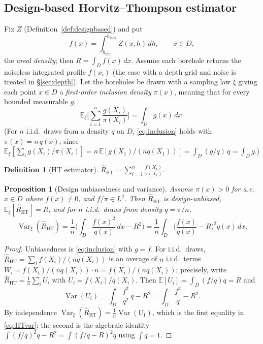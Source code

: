 \documentclass{amsart}
\newtheorem{proposition}[theorem]{Proposition}
\theoremstyle{definition}
\newtheorem{definition}[theorem]{Definition}
\newcommand{\E}{\mathbb{E}}
\newcommand{\Var}{\operatorname{Var}}
\newcommand{\Rhat}{\widehat R}
\begin{document}
\subsection{Design-based Horvitz--Thompson estimator}
Fix $Z$ (Definition~\ref{def:designbased}) and put
\begin{equation}\label{eq:profile}
f(x)=\int_{h_{\min}}^{h_{\max}}Z(x,h)\,dh,\qquad x\in D,
\end{equation}
the \emph{areal density}; then $R=\int_D f(x)\,dx$. Assume each borehole
returns the noiseless integrated profile $f(x_i)$ (the case with a depth
grid and noise is treated in \S\ref{sec:depth}). Let the boreholes be
drawn with a sampling law $\xi$ giving each point $x\in D$ a
\emph{first-order inclusion density} $\pi(x)$, meaning that for every
bounded measurable $g$,
\begin{equation}\label{eq:inclusion}
\E_\xi\Big[\sum_{i=1}^n \frac{g(X_i)}{\pi(X_i)}\Big]=\int_D g(x)\,dx .
\end{equation}
(For $n$ i.i.d.\ draws from a density $q$ on $D$, \eqref{eq:inclusion}
holds with $\pi(x)=n\,q(x)$, since
$\E_\xi[\sum_i g(X_i)/\pi(X_i)] = n\,\E[g(X_1)/(nq(X_1))]
=\int_D (g/q)\,q=\int_D g$.)

\begin{definition}[HT estimator]
$\displaystyle \Rhat_{\mathrm{HT}}
=\sum_{i=1}^n \frac{f(X_i)}{\pi(X_i)}.$
\end{definition}

\begin{proposition}[Design unbiasedness and variance]\label{prop:HT}
Assume $\pi(x)>0$ for a.e.\ $x\in D$ where $f(x)\ne0$, and $f/\pi\in
L^2$. Then $\Rhat_{\mathrm{HT}}$ is design-unbiased,
$\E_\xi[\Rhat_{\mathrm{HT}}]=R$, and for $n$ i.i.d.\ draws from density
$q=\pi/n$,
\begin{equation}\label{eq:HTvar}
\Var_\xi(\Rhat_{\mathrm{HT}})
=\frac1n\Big(\int_D \frac{f(x)^2}{q(x)}\,dx - R^2\Big)
=\frac1n\int_D\Big(\frac{f(x)}{q(x)}-R\Big)^2 q(x)\,dx .
\end{equation}
\end{proposition}

\begin{proof}
Unbiasedness is \eqref{eq:inclusion} with $g=f$. For i.i.d.\ draws,
$\Rhat_{\mathrm{HT}}=\sum_i f(X_i)/(nq(X_i))$ is an average of $n$
i.i.d.\ terms $W_i=f(X_i)/(nq(X_i))\cdot n = f(X_i)/(nq(X_i))$; precisely,
write $\Rhat_{\mathrm{HT}}=\frac1n\sum_i U_i$ with
$U_i=f(X_i)/q(X_i)$. Then $\E[U_i]=\int_D (f/q)q=R$ and
\[
\Var(U_i)=\int_D \frac{f^2}{q^2}\,q - R^2=\int_D\frac{f^2}{q}-R^2 .
\]
By independence $\Var_\xi(\Rhat_{\mathrm{HT}})=\frac1n\Var(U_1)$, which is
the first equality in \eqref{eq:HTvar}; the second is the algebraic
identity $\int (f/q)^2 q - R^2 = \int (f/q-R)^2 q$ using $\int q=1$.
\end{proof}
\end{document}
